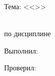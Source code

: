 \begin{ESKDtitlePage}
    \begin{center}
        \gpiMinEduRep \\
        \gpiEduRep \\
        \gpiKafRep \\
    \end{center}

    \vfill

    \begin{center}
        Тема: <<\gpiTopicRep>>
    \end{center}

    \vfill

    \begin{center}
        \textbf{\gpiDocTopic} \\
        по дисциплине \gpiDisciplineRep \\
    \end{center}

    \vfill

    \begin{flushright}
        \begin{minipage}[t]{7cm}
            Выполнил:\\
            \PageTitleStudentInfo
            \PageTitleDateField
            \hspace{0pt}

            Проверил:\\
            \PageTitleTeacherInfo
            \PageTitleDateField
        \end{minipage}
    \end{flushright}

    \vfill

    \begin{center}
        \PageTitleCity~\ESKDtheYear
    \end{center}
\end{ESKDtitlePage}
